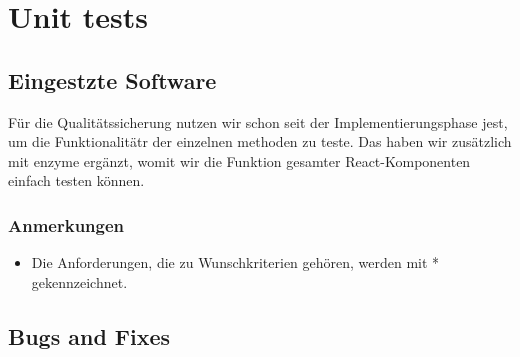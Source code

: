 \section{Unit tests}

\subsection{Eingestzte Software}

Für die Qualitätssicherung nutzen wir schon seit der Implementierungsphase jest, um die Funktionalitätr der einzelnen methoden zu teste. Das haben wir zusätzlich mit enzyme ergänzt, womit wir die Funktion gesamter React-Komponenten einfach testen können.

\subsubsection{Anmerkungen}
\begin{itemize}
  \item Die Anforderungen, die zu Wunschkriterien gehören, werden mit * gekennzeichnet.
\end{itemize}

\setcounter{counter}{10}

\subsection{Bugs and Fixes}




